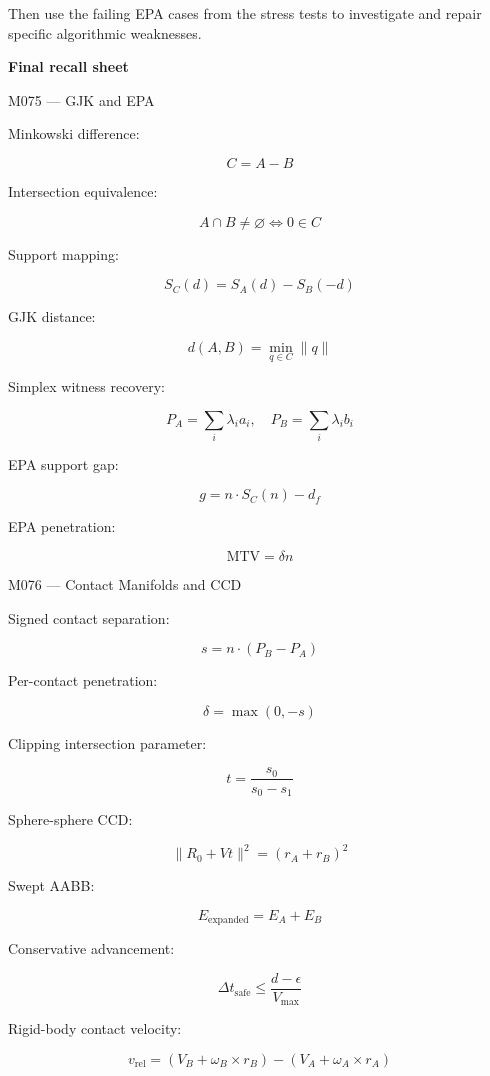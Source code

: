 Then use the failing EPA cases from the stress tests to investigate and repair specific algorithmic weaknesses.

\textbf{Final recall sheet}

M075 --- GJK and EPA

Minkowski difference:

\[
C=A-B
\]

Intersection equivalence:

\[
\boxed{A\cap B\ne\varnothing\iff0\in C}
\]

Support mapping:

\[
\boxed{S_C(d)=S_A(d)-S_B(-d)}
\]

GJK distance:

\[
\boxed{d(A,B)=\min_{q\in C}\|q\|}
\]

Simplex witness recovery:

\[
\boxed{P_A=\sum_i\lambda_ia_i,\quad P_B=\sum_i\lambda_ib_i}
\]

EPA support gap:

\[
\boxed{g=n\cdot S_C(n)-d_f}
\]

EPA penetration:

\[
\boxed{\mathrm{MTV}=\delta n}
\]

M076 --- Contact Manifolds and CCD

Signed contact separation:

\[
\boxed{s=n\cdot(P_B-P_A)}
\]

Per-contact penetration:

\[
\boxed{\delta=\max(0,-s)}
\]

Clipping intersection parameter:

\[
\boxed{t=\frac{s_0}{s_0-s_1}}
\]

Sphere-sphere CCD:

\[
\boxed{\|R_0+Vt\|^2=(r_A+r_B)^2}
\]

Swept AABB:

\[
\boxed{E_{\mathrm{expanded}}=E_A+E_B}
\]

Conservative advancement:

\[
\boxed{\Delta t_{\mathrm{safe}}\le\frac{d-\epsilon}{V_{\max}}}
\]

Rigid-body contact velocity:

\[
\boxed{ v_{\mathrm{rel}}= (V_B+\omega_B\times r_B) - (V_A+\omega_A\times r_A) }
\]

